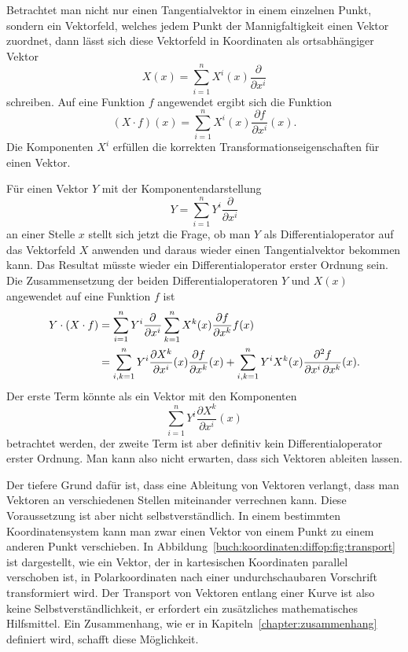 Betrachtet man nicht nur einen Tangentialvektor in einem einzelnen
Punkt, sondern ein Vektorfeld, welches jedem Punkt der Mannigfaltigkeit
einen Vektor zuordnet, dann lässt sich diese Vektorfeld in Koordinaten
als ortsabhängiger Vektor
\[
X(x)
=
\sum_{i=1}^n
X^i(x)
\frac{\partial}{\partial x^i}
\]
schreiben.
Auf eine Funktion $f$ angewendet ergibt sich die Funktion
\[
(X\cdot f)(x)
=
\sum_{i=1}^n X^i(x)\frac{\partial f}{\partial x^i}(x).
\]
Die Komponenten $X^i$ erfüllen die korrekten Transformationseigenschaften
für einen Vektor.

Für einen Vektor $Y$ mit der Komponentendarstellung
\[
Y
=
\sum_{i=1}^n
Y^i\frac{\partial}{\partial x^i}
\]
an einer Stelle $x$ stellt sich jetzt die Frage, ob man $Y$ als
Differentialoperator auf das Vektorfeld $X$ anwenden und daraus
wieder einen Tangentialvektor bekommen kann.
Das Resultat müsste wieder ein Differentialoperator erster Ordnung
sein.
Die Zusammensetzung der beiden Differentialoperatoren $Y$ und $X(x)$
angewendet auf eine Funktion $f$ ist
\begin{align}
Y\cdot(X\cdot f)
&=
\sum_{i=1}^n Y^i\frac{\partial}{\partial x^i}
\sum_{k=1}^n
X^k(x)
\frac{\partial f}{\partial x^k}f(x)
\notag
\\
&=
\sum_{i,k=1}^n
Y^i
\frac{\partial X^k}{\partial x^i}(x)
\frac{\partial f}{\partial x^k}(x)
+
\sum_{i,k=1}^n
Y^i
X^k(x)
\frac{\partial^2 f}{\partial x^i\,\partial x^k}(x).
\label{buch:koordinaten:diffop:eqn:vektorableitung}
\end{align}
Der erste Term könnte als ein Vektor mit den Komponenten 
\[
\sum_{i=1}^n
Y^i\frac{\partial X^k}{\partial x^i}(x)
\]
betrachtet werden, der zweite Term ist aber definitiv kein
Differentialoperator erster Ordnung.
Man kann also nicht erwarten, dass sich Vektoren ableiten lassen.

Der tiefere Grund dafür ist, dass eine Ableitung von Vektoren verlangt,
dass man Vektoren an verschiedenen Stellen miteinander verrechnen kann.
Diese Voraussetzung ist aber nicht selbstverständlich.
%
In einem bestimmten Koordinatensystem kann man zwar einen Vektor
von einem Punkt zu einem anderen Punkt verschieben.
In Abbildung~\ref{buch:koordinaten:diffop:fig:transport}
ist dargestellt, wie ein Vektor, der in kartesischen Koordinaten
parallel verschoben ist, in Polarkoordinaten nach einer undurchschaubaren
Vorschrift transformiert wird.
Der Transport von Vektoren entlang einer Kurve ist also keine
Selbstverständlichkeit, er erfordert ein zusätzliches mathematisches
Hilfsmittel.
Ein Zusammenhang, wie er in Kapiteln~\ref{chapter:zusammenhang} definiert
wird, schafft diese Möglichkeit.

